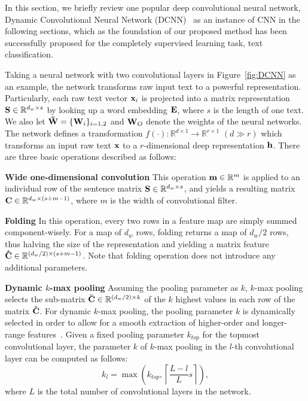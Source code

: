 \documentclass[review]{elsarticle}
\begin{document}
In this section, we briefly review one popular deep convolutional neural network, Dynamic Convolutional Neural Network (DCNN)~\cite{16_blunsom2014convolutional} as an instance of CNN in the following sections, which as the foundation of our proposed method has been successfully proposed for the completely supervised learning task, text classification.

Taking a neural network with two convolutional layers in Figure~\ref{fig:DCNN} as an example, the network transforms raw input text to a powerful representation. Particularly, each raw text vector \({{\bf{x}}_i}\) is projected into a matrix representation \({\bf{S}} \in {\mathbb{R}^{{d_w} \times s}}\) by looking up a word embedding \({\bf{E}}\), where \({s}\) is the length of one text. We also let \({\bf{\tilde W}} = {\{ {{\bf{W}}_i}\} _{i = 1,2}}\) and \({{\bf{W}}_O}\) denote the weights of the neural networks. The network defines a transformation \(f( \cdot ):{\mathbb{R}^{d \times 1}} \to {\mathbb{R}^{r \times 1}}\) \((d \gg r)\) which transforms an input raw text \({\bf{x}}\) to a \(r\)-dimensional deep representation \({\bf{h}}\). There are three basic operations described as follows:

 {\bf{Wide one-dimensional convolution}} This operation \({\bf{m}} \in {\mathbb{R}^m}\) is applied to an individual row of the sentence matrix \({\bf{S}} \in {\mathbb{R}^{{d_w} \times s}}\), and yields a resulting matrix \({\bf{C}} \in {\mathbb{R}^{  {d_w} \times {(s + m - 1)} }}\), where \(m\) is the width of convolutional filter.


 {\bf{Folding}}  In this operation, every two rows in a feature map are simply summed component-wisely. For a map of \(d_w\) rows, folding returns a map of \(d_w/2\) rows, thus halving the size of the representation and yielding a matrix feature \({\bf{\hat C}} \in {\mathbb{R}^{  {(d_w/2)} \times {(s + m - 1)} }}\). Note that folding operation does not introduce any additional parameters.

{\bf{Dynamic \(k\)-max pooling}} Assuming the pooling parameter as \(k\), \(k\)-max pooling selects the sub-matrix \({\bf{\bar C}} \in {\mathbb{R}^{  {(d_w/2)} \times {k} }}\) of the \(k\) highest values in each row of the matrix \({\bf{\hat C}}\). For dynamic \(k\)-max pooling, the pooling parameter \(k\) is dynamically selected in order to allow for a smooth extraction of higher-order and longer-range features~\cite{16_blunsom2014convolutional}. Given a fixed pooling parameter \(k_{top}\) for the topmost convolutional layer, the parameter \(k\) of \(k\)-max pooling in the \(l\)-th convolutional layer can be computed as follows:
\begin{equation}
{k_l} = \max ({k_{top}},\left\lceil {\frac{{L - l}}{L}s} \right\rceil ),
\label{eq:Ktop}
\end{equation}
where \(L\) is the total number of convolutional layers in the network.
\end{document}
